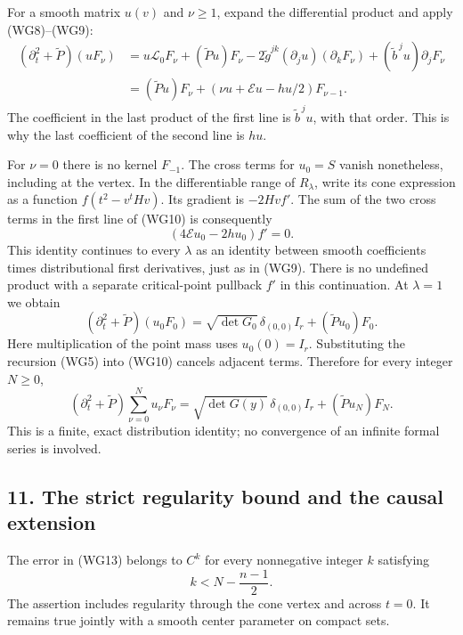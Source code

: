 \documentclass[
  11pt,
]{article}
\begin{document}
For a smooth matrix \(u(v)\) and \(\nu\geq1\), expand the differential
product and apply (WG8)--(WG9): \[
\begin{split}
 (\partial_t^2+\widetilde P)(uF_\nu)
  &=u\mathscr L_0F_\nu+(\widetilde Pu)F_\nu
       -2\widetilde g^{jk}(\partial_ju)(\partial_kF_\nu)
       +(\widetilde b^{\,j}u)\partial_jF_\nu\\
  &=(\widetilde Pu)F_\nu+
       (\nu u+\mathcal Eu-hu/2)F_{\nu-1}.
\end{split}
 \tag{WG10}
\] The coefficient in the last product of the first line is
\(\widetilde b^{\,j}u\), with that order. This is why the last
coefficient of the second line is \(hu\).

For \(\nu=0\) there is no kernel \(F_{-1}\). The cross terms for
\(u_0=S\) vanish nonetheless, including at the vertex. In the
differentiable range of \(R_\lambda\), write its cone expression as a
function \(f(t^2-v^tHv)\). Its gradient is \(-2Hv f'\). The sum of the
two cross terms in the first line of (WG10) is consequently \[
                     (4\mathcal Eu_0-2hu_0)f'=0.
 \tag{WG11}
\] This identity continues to every \(\lambda\) as an identity between
smooth coefficients times distributional first derivatives, just as in
(WG9). There is no undefined product with a separate critical-point
pullback \(f'\) in this continuation. At \(\lambda=1\) we obtain \[
 (\partial_t^2+\widetilde P)(u_0F_0)
   =\sqrt{\det G_0}\,\delta_{(0,0)}I_r
                           +(\widetilde Pu_0)F_0.
 \tag{WG12}
\] Here multiplication of the point mass uses \(u_0(0)=I_r\).
Substituting the recursion (WG5) into (WG10) cancels adjacent terms.
Therefore for every integer \(N\geq0\), \[
 (\partial_t^2+\widetilde P)\sum_{\nu=0}^Nu_\nu F_\nu
   =\sqrt{\det G(y)}\,\delta_{(0,0)}I_r
                             +(\widetilde Pu_N)F_N.
 \tag{WG13}
\] This is a finite, exact distribution identity; no convergence of an
infinite formal series is involved.

\subsection{11. The strict regularity bound and the causal
extension}\label{the-strict-regularity-bound-and-the-causal-extension}

The error in (WG13) belongs to \(C^k\) for every nonnegative integer
\(k\) satisfying \[
                            k<N-\frac{n-1}{2}.
 \tag{WG14}
\] The assertion includes regularity through the cone vertex and across
\(t=0\). It remains true jointly with a smooth center parameter on
compact sets.
\end{document}
